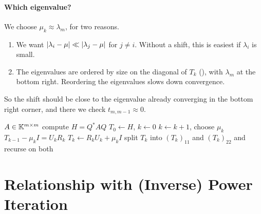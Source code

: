 \paragraph{Which eigenvalue?} We choose $\mu_k \approx \lambda_m$, for two reasons.
\begin{enumerate}
  \item We want $\left\lvert \lambda_i - \mu \right\rvert \ll \left\lvert \lambda_j - \mu \right\rvert$ for $j \ne i$. Without a shift, this is easiest if $\lambda_i$ is small.
  \item The eigenvalues are ordered by size on the diagonal of $T_k$ (), with $\lambda_m$ at the bottom right. Reordering the eigenvalues slows down convergence.
\end{enumerate}
So the shift should be close to the eigenvalue already converging in the bottom right corner, and there we check $t_{m,m-1} \approx 0$.

\begin{algorithm}[H]
  \caption{Practical QR iteration.}
  \label{alg:practical-qr}
  \begin{algorithmic}[1]
    \Require $A \in \mathbb{K}^{m \times m}$
    \State compute $H = Q^\ast AQ$ 
    \State $T_0 \gets H$, $k \gets 0$
      \State $k \gets k + 1$, choose $\mu_k$
      \State $T_{k-1} - \mu_kI = U_kR_k$ 
      \State $T_k \gets R_kU_k + \mu_kI$
        \State split $T_k$ into $(T_k)_{11}$ and $(T_k)_{22}$ and recurse on both
      \EndIf
    \EndWhile
  \end{algorithmic}
\end{algorithm}

\section{Relationship with (Inverse) Power Iteration}
\label{sec:shifted-orth-iter}

